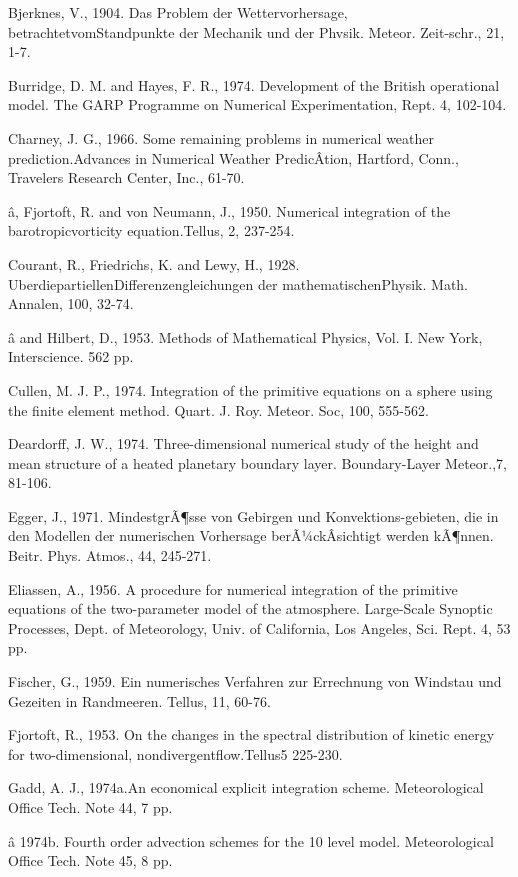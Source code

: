 Bjerknes, V., 1904. Das Problem der Wettervorhersage,
betrachtetvomStandpunkte der Mechanik und der Phvsik. Meteor.
Zeit-schr., 21, 1-7.

Burridge, D. M. and Hayes, F. R., 1974. Development of the British
operational model. The GARP Programme on Numerical Experimentation,
Rept. 4, 102-104.

Charney, J. G., 1966. Some remaining problems in numerical weather
prediction.Advances in Numerical Weather PredicÂ­tion, Hartford, Conn.,
Travelers Research Center, Inc., 61-70.

â, Fjortoft, R. and von Neumann, J., 1950. Numerical integration of the
barotropicvorticity equation.Tellus, 2, 237-254.

Courant, R., Friedrichs, K. and Lewy, H., 1928.
UberdiepartiellenDifferenzengleichungen der mathematischenPhysik. Math.
Annalen, 100, 32-74.

â and Hilbert, D., 1953. Methods of Mathematical Physics, Vol. I. New
York, Interscience. 562 pp.

Cullen, M. J. P., 1974. Integration of the primitive equations on a
sphere using the finite element method. Quart. J. Roy. Meteor. Soc, 100,
555-562.

Deardorff, J. W., 1974. Three-dimensional numerical study of the height
and mean structure of a heated planetary boundary layer. Boundary-Layer
Meteor.,7, 81-106.

Egger, J., 1971. MindestgrÃ¶sse von Gebirgen und Konvektions-gebieten,
die in den Modellen der numerischen Vorhersage berÃ¼ckÂ­sichtigt werden
kÃ¶nnen. Beitr. Phys. Atmos., 44, 245-271.

Eliassen, A., 1956. A procedure for numerical integration of the
primitive equations of the two-parameter model of the atmosphere.
Large-Scale Synoptic Processes, Dept. of Meteorology, Univ. of
California, Los Angeles, Sci. Rept. 4, 53 pp.

Fischer, G., 1959. Ein numerisches Verfahren zur Errechnung von Windstau
und Gezeiten in Randmeeren. Tellus, 11, 60-76.

Fjortoft, R., 1953. On the changes in the spectral distribution of
kinetic energy for two-dimensional, nondivergentflow.Tellus5 225-230.

Gadd, A. J., 1974a.An economical explicit integration scheme.
Meteorological Office Tech. Note 44, 7 pp.

â 1974b. Fourth order advection schemes for the 10 level model.
Meteorological Office Tech. Note 45, 8 pp.


